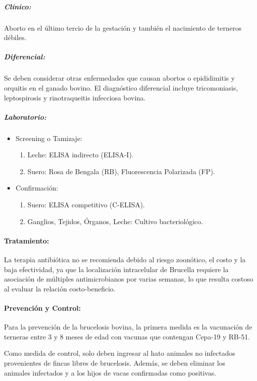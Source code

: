             \subparagraph{Clínico:} Aborto en el último tercio de la gestación y también el nacimiento de terneros débiles.

            \subparagraph{Diferencial:} Se deben considerar otras enfermedades que causan abortos o epididimitis y orquitis en el ganado bovino. El diagnóstico diferencial incluye tricomoniasis, leptospirosis y rinotraqueitis infecciosa bovina.

            \subparagraph{Laboratorio:}

            \begin{itemize}
                \item Screening o Tamizaje:
                \begin{enumerate}
                    \item Leche: ELISA indirecto (ELISA-I).
                    \item Suero: Rosa de Bengala (RB), Fluorescencia Polarizada (FP).
                \end{enumerate}
                \item Confirmación:
                \begin{enumerate}
                    \item Suero: ELISA competitivo (C-ELISA).
                    \item Ganglios, Tejidos, Órganos, Leche: Cultivo bacteriológico.
                \end{enumerate}
            \end{itemize}

            \paragraph{Tratamiento:} La terapia antibiótica no se recomienda debido al riesgo zoonótico, el costo y la baja efectividad, ya que la localización intracelular de Brucella requiere la asociación de múltiples antimicrobianos por varias semanas, lo que resulta costoso al evaluar la relación costo-beneficio.

            \paragraph{Prevención y Control:} Para la prevención de la brucelosis bovina, la primera medida es la vacunación de terneras entre 3 y 8 meses de edad con vacunas que contengan Cepa-19 y RB-51.

            Como medida de control, solo deben ingresar al hato animales no infectados provenientes de fincas libres de brucelosis. Además, se deben eliminar los animales infectados y a los hijos de vacas confirmadas como positivas.

